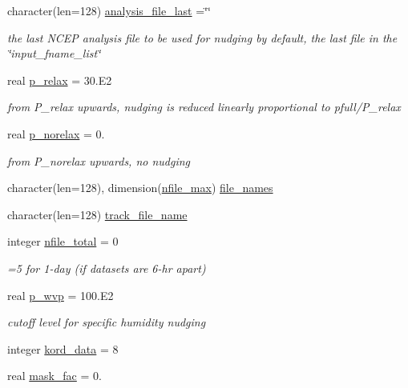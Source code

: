 \begin{DoxyCompactItemize}
character(len=128) \hyperlink{classfv__nwp__nudge__mod_ab3049eb4b3e719220321b47aad4303ba}{analysis\-\_\-file\-\_\-last} =\char`\"{}\char`\"{}
\begin{DoxyCompactList}\small\item\em the last N\-C\-E\-P analysis file to be used for nudging by default, the last file in the \char`\"{}input\-\_\-fname\-\_\-list\char`\"{} \end{DoxyCompactList}\item 
real \hyperlink{classfv__nwp__nudge__mod_a67d18a2de5bc8c716affd9b18e65de34}{p\-\_\-relax} = 30.E2
\begin{DoxyCompactList}\small\item\em from P\-\_\-relax upwards, nudging is reduced linearly proportional to pfull/\-P\-\_\-relax \end{DoxyCompactList}\item 
real \hyperlink{classfv__nwp__nudge__mod_af6821904d98d5a2b0c18d7f01061693b}{p\-\_\-norelax} = 0.
\begin{DoxyCompactList}\small\item\em from P\-\_\-norelax upwards, no nudging \end{DoxyCompactList}\item 
character(len=128), dimension(\hyperlink{classfv__nwp__nudge__mod_a7fb7b0e5d02de9ce46ac54830d236d60}{nfile\-\_\-max}) \hyperlink{classfv__nwp__nudge__mod_a4a4209d304ae4ac9cd30d3139b1bfb6d}{file\-\_\-names}
\item 
character(len=128) \hyperlink{classfv__nwp__nudge__mod_a2a733b4b29ac3b974f5bc194e8a33fb3}{track\-\_\-file\-\_\-name}
\item 
integer \hyperlink{classfv__nwp__nudge__mod_a16ad156aeca41cd051feaf6544535476}{nfile\-\_\-total} = 0
\begin{DoxyCompactList}\small\item\em =5 for 1-\/day (if datasets are 6-\/hr apart) \end{DoxyCompactList}\item 
real \hyperlink{classfv__nwp__nudge__mod_a05315b1d11b770d5ea2eb43325d8fe83}{p\-\_\-wvp} = 100.E2
\begin{DoxyCompactList}\small\item\em cutoff level for specific humidity nudging \end{DoxyCompactList}\item 
integer \hyperlink{classfv__nwp__nudge__mod_a22e044d4dce29168ca4a9a97017a6759}{kord\-\_\-data} = 8
\item 
real \hyperlink{classfv__nwp__nudge__mod_a0393a20ffd09b6005c121df77b990757}{mask\-\_\-fac} = 0.

\end{DoxyCompactItemize}

